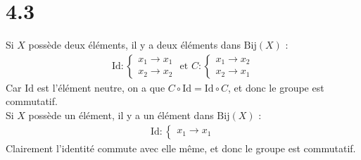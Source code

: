 \documentclass[11pt, a4paper, twoside]{article}
\newcommand{\Bij}{\mathrm{Bij}}
\newcommand{\Id}{\mathrm{Id}}
\begin{document}
\section*{4.3}
Si $X$ possède deux éléments, il y a deux éléments dans $\Bij(X)$ :
\begin{align*}
\Id:
\begin{cases}
x_1 \to x_{1}\\
x_2 \to x_2
\end{cases}
\text{ et } 
C:
\begin{cases}
x_1 \to x_2\\
x_2 \to x_1
\end{cases}
\end{align*}
Car $\Id$ est l'élément neutre, on a que $C \circ \Id = \Id \circ C$, et donc le groupe est commutatif.\\
Si $X$ possède un élément, il y a un élément dans $\Bij(X)$ :
\begin{align*}
\Id:
\begin{cases}
x_1 \to x_1
\end{cases}
\end{align*}
Clairement l'identité commute avec elle même, et donc le groupe est commutatif.





\end{document}

